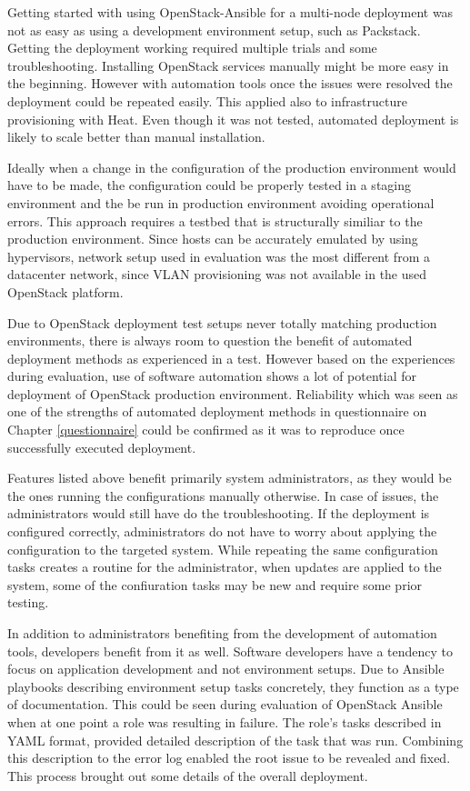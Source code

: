 Getting started with using OpenStack-Ansible for a multi-node deployment was
not as easy as using a development environment setup, such as Packstack.
Getting the deployment working required multiple trials and some
troubleshooting. Installing OpenStack services manually might be more easy in
the beginning. However with automation tools once the issues were resolved the
deployment could be repeated easily. This applied also to infrastructure
provisioning with Heat. Even though it was not tested, automated deployment is
likely to scale better than manual installation.

Ideally when a change in the configuration of the production environment would
have to be made, the configuration could be properly tested in a staging
environment and the be run in production environment avoiding operational
errors. This approach requires a testbed that is structurally similiar to the
production environment. Since hosts can be accurately emulated by using
hypervisors, network setup used in evaluation was the most different from a
datacenter network, since VLAN provisioning was not available in the used
OpenStack platform.

Due to OpenStack deployment test setups never totally matching production
environments, there is always room to question the benefit of automated
deployment methods as experienced in a test. However based on the experiences
during evaluation, use of software automation shows a lot of potential for
deployment of OpenStack production environment. Reliability which was seen as
one of the strengths of automated deployment methods in questionnaire on
Chapter \ref{questionnaire} could be confirmed as it was to reproduce once
successfully executed deployment.

Features listed above benefit primarily system administrators, as they would be
the ones running the configurations manually otherwise. In case of issues, the
administrators would still have do the troubleshooting. If the deployment is
configured correctly, administrators do not have to worry about applying the
configuration to the targeted system. While repeating the same configuration
tasks creates a routine for the administrator, when updates are applied to the
system, some of the confiuration tasks may be new and require some prior
testing.

In addition to administrators benefiting from the development of automation
tools, developers benefit from it as well. Software developers have a tendency
to focus on application development and not environment setups. Due to Ansible
playbooks describing environment setup tasks concretely, they function as a
type of documentation. This could be seen during evaluation of OpenStack
Ansible when at one point a role was resulting in failure. The role's tasks
described in YAML format, provided detailed description of the task that was
run. Combining this description to the error log enabled the root issue to be
revealed and fixed. This process brought out some details of the overall
deployment.

